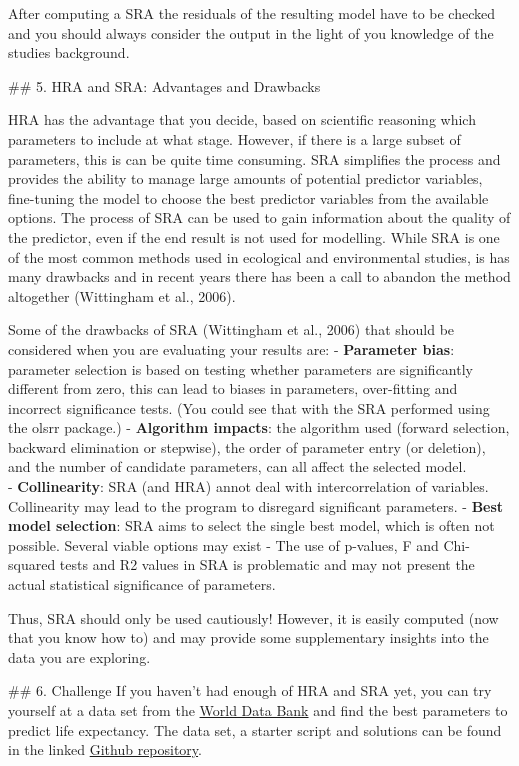 \documentclass[
]{article}
\begin{document}
After computing a SRA the residuals of the resulting model have to be
checked and you should always consider the output in the light of you
knowledge of the studies background.

\#\# 5. HRA and SRA: Advantages and Drawbacks

HRA has the advantage that you decide, based on scientific reasoning
which parameters to include at what stage. However, if there is a large
subset of parameters, this is can be quite time consuming. SRA
simplifies the process and provides the ability to manage large amounts
of potential predictor variables, fine-tuning the model to choose the
best predictor variables from the available options. The process of SRA
can be used to gain information about the quality of the predictor, even
if the end result is not used for modelling. While SRA is one of the
most common methods used in ecological and environmental studies, is has
many drawbacks and in recent years there has been a call to abandon the
method altogether (Wittingham et al., 2006).

Some of the drawbacks of SRA (Wittingham et al., 2006) that should be
considered when you are evaluating your results are: - \textbf{Parameter
bias}: parameter selection is based on testing whether parameters are
significantly different from zero, this can lead to biases in
parameters, over-fitting and incorrect significance tests. (You could
see that with the SRA performed using the olsrr package.) -
\textbf{Algorithm impacts}: the algorithm used (forward selection,
backward elimination or stepwise), the order of parameter entry (or
deletion), and the number of candidate parameters, can all affect the
selected model.\\
- \textbf{Collinearity}: SRA (and HRA) annot deal with intercorrelation
of variables. Collinearity may lead to the program to disregard
significant parameters. - \textbf{Best model selection}: SRA aims to
select the single best model, which is often not possible. Several
viable options may exist - The use of p-values, F and Chi-squared tests
and R2 values in SRA is problematic and may not present the actual
statistical significance of parameters.

Thus, SRA should only be used cautiously! However, it is easily computed
(now that you know how to) and may provide some supplementary insights
into the data you are exploring.

\#\# 6. Challenge If you haven't had enough of HRA and SRA yet, you can
try yourself at a data set from the \href{}{World Data Bank} and find
the best parameters to predict life expectancy. The data set, a starter
script and solutions can be found in the linked \href{}{Github
repository}.
\end{document}

